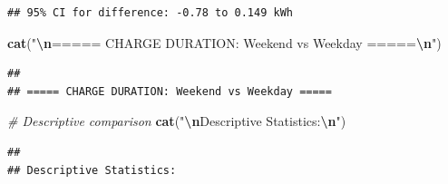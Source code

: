 \documentclass[
  12pt,
]{article}
\newenvironment{Shaded}{\begin{snugshade}}{\end{snugshade}}
\newcommand{\AttributeTok}[1]{\textcolor[rgb]{0.13,0.29,0.53}{#1}}
\newcommand{\CommentTok}[1]{\textcolor[rgb]{0.56,0.35,0.01}{\textit{#1}}}
\newcommand{\DecValTok}[1]{\textcolor[rgb]{0.00,0.00,0.81}{#1}}
\newcommand{\FunctionTok}[1]{\textcolor[rgb]{0.13,0.29,0.53}{\textbf{#1}}}
\newcommand{\NormalTok}[1]{#1}
\newcommand{\SpecialCharTok}[1]{\textcolor[rgb]{0.81,0.36,0.00}{\textbf{#1}}}
\newcommand{\StringTok}[1]{\textcolor[rgb]{0.31,0.60,0.02}{#1}}
\begin{document}
\begin{Shaded}
\end{Shaded}

\begin{verbatim}
## 95% CI for difference: -0.78 to 0.149 kWh
\end{verbatim}

\begin{Shaded}
\begin{Highlighting}[]
\FunctionTok{cat}\NormalTok{(}\StringTok{"}\SpecialCharTok{\textbackslash{}n}\StringTok{===== CHARGE DURATION: Weekend vs Weekday =====}\SpecialCharTok{\textbackslash{}n}\StringTok{"}\NormalTok{)}
\end{Highlighting}
\end{Shaded}

\begin{verbatim}
## 
## ===== CHARGE DURATION: Weekend vs Weekday =====
\end{verbatim}

\begin{Shaded}
\begin{Highlighting}[]
\CommentTok{\# Descriptive comparison}
\FunctionTok{cat}\NormalTok{(}\StringTok{"}\SpecialCharTok{\textbackslash{}n}\StringTok{Descriptive Statistics:}\SpecialCharTok{\textbackslash{}n}\StringTok{"}\NormalTok{)}
\end{Highlighting}
\end{Shaded}

\begin{verbatim}
## 
## Descriptive Statistics:
\end{verbatim}

\begin{Shaded}
\end{Shaded}
\end{document}
